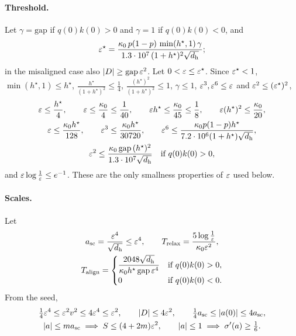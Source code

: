 \paragraph{Threshold.} Let $\gamma=\mathrm{gap}$ if $q(0)k(0)>0$ and $\gamma=1$ if $q(0)k(0)<0$, and
\[
 \varepsilon^\star=\frac{\kappa_0\,p(1-p)\,\min(h^\star,1)\,\gamma}{1.3\cdot10^7\,(1+h^\star)^2\sqrt{d_{\mathrm h}}} ;
\]
in the misaligned case also $|D|\ge\mathrm{gap}\,\varepsilon^2$. Let $0<\varepsilon\le\varepsilon^\star$. Since $\varepsilon^\star<1$, $\min(h^\star,1)\le h^\star$,
$\frac{h^\star}{(1+h^\star)^2}\le\frac{1}{4}$, $\frac{(h^\star)^2}{(1+h^\star)^2}\le1$, $\gamma\le1$, $\varepsilon^3,\varepsilon^6\le\varepsilon$ and $\varepsilon^2\le(\varepsilon^\star)^2$,
\begin{equation}
 \begin{gathered}
 \varepsilon\le\frac{h^\star}{4},\qquad \varepsilon\le\frac{\kappa_0}{4}\le\frac{1}{40},\qquad \varepsilon h^\star\le\frac{\kappa_0}{45}\le\frac{1}{8},\qquad
 \varepsilon(h^\star)^2\le\frac{\kappa_0}{20},\\
 \varepsilon\le\frac{\kappa_0h^\star}{128},\qquad \varepsilon^3\le\frac{\kappa_0h^\star}{30720},\qquad
 \varepsilon^6\le\frac{\kappa_0p(1-p)h^\star}{7.2\cdot10^6(1+h^\star)\sqrt{d_{\mathrm h}}},\\
 \varepsilon^2\le\frac{\kappa_0\,\mathrm{gap}\,(h^\star)^2}{1.3\cdot10^7\sqrt{d_{\mathrm h}}}\quad\text{if }q(0)k(0)>0,
 \end{gathered}
 \label{eq:J-eps}
\end{equation}
and $\varepsilon\log\frac{1}{\varepsilon}\le e^{-1}$. These are the only smallness properties of $\varepsilon$ used below.

\paragraph{Scales.} Let
\begin{gather*}
 a_{\mathrm{sc}}=\frac{\varepsilon^4}{\sqrt{d_{\mathrm h}}}\le\varepsilon^4,\qquad
 T_{\mathrm{relax}}=\frac{5\log\frac{1}{\varepsilon}}{\kappa_0\varepsilon^2},\\
 T_{\mathrm{align}}=\begin{cases}\dfrac{2048\sqrt{d_{\mathrm h}}}{\kappa_0h^\star\,\mathrm{gap}\,\varepsilon^4}&\text{if }q(0)k(0)>0,\\0&\text{if }q(0)k(0)<0.\end{cases}
\end{gather*}
From the seed,
\begin{equation}
 \begin{gathered}
 \tfrac{1}{4}\varepsilon^4\le \varepsilon^2v^2\le4\varepsilon^4\le\varepsilon^2,\qquad |D|\le4\varepsilon^2,\qquad \tfrac{1}{4}a_{\mathrm{sc}}\le|a(0)|\le4a_{\mathrm{sc}},\\
 |a|\le ma_{\mathrm{sc}}\implies S\le(4+2m)\varepsilon^2,\qquad |a|\le1\implies\sigma'(a)\ge\tfrac{1}{6} .
 \end{gathered}
 \label{eq:J-scales}
\end{equation}


